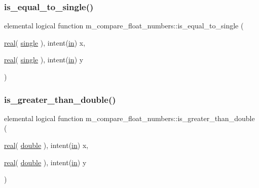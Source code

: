 \subsubsection{\texorpdfstring{is\+\_\+equal\+\_\+to\+\_\+single()}{is\_equal\_to\_single()}}
{\footnotesize\ttfamily elemental logical function m\+\_\+compare\+\_\+float\+\_\+numbers\+::is\+\_\+equal\+\_\+to\+\_\+single (\begin{DoxyParamCaption}\item[{\hyperlink{read__watch_83_8txt_abdb62bde002f38ef75f810d3a905a823}{real}( \hyperlink{namespacem__compare__float__numbers_a5f122d46d6ad7d1cf0b899d9c855c498}{single} ), intent(\hyperlink{M__journal_83_8txt_afce72651d1eed785a2132bee863b2f38}{in})}]{x,  }\item[{\hyperlink{read__watch_83_8txt_abdb62bde002f38ef75f810d3a905a823}{real}( \hyperlink{namespacem__compare__float__numbers_a5f122d46d6ad7d1cf0b899d9c855c498}{single} ), intent(\hyperlink{M__journal_83_8txt_afce72651d1eed785a2132bee863b2f38}{in})}]{y }\end{DoxyParamCaption})\hspace{0.3cm}{\ttfamily [private]}}

\mbox{\label{namespacem__compare__float__numbers_ac0b7c9aeec5a785ebff7a6e59ba5fb26}} 
\subsubsection{\texorpdfstring{is\+\_\+greater\+\_\+than\+\_\+double()}{is\_greater\_than\_double()}}
{\footnotesize\ttfamily elemental logical function m\+\_\+compare\+\_\+float\+\_\+numbers\+::is\+\_\+greater\+\_\+than\+\_\+double (\begin{DoxyParamCaption}\item[{\hyperlink{read__watch_83_8txt_abdb62bde002f38ef75f810d3a905a823}{real}( \hyperlink{namespacem__compare__float__numbers_af4b789cd6e1a2abcd412eaf29e91ea0c}{double} ), intent(\hyperlink{M__journal_83_8txt_afce72651d1eed785a2132bee863b2f38}{in})}]{x,  }\item[{\hyperlink{read__watch_83_8txt_abdb62bde002f38ef75f810d3a905a823}{real}( \hyperlink{namespacem__compare__float__numbers_af4b789cd6e1a2abcd412eaf29e91ea0c}{double} ), intent(\hyperlink{M__journal_83_8txt_afce72651d1eed785a2132bee863b2f38}{in})}]{y }\end{DoxyParamCaption})\hspace{0.3cm}{\ttfamily [private]}}



